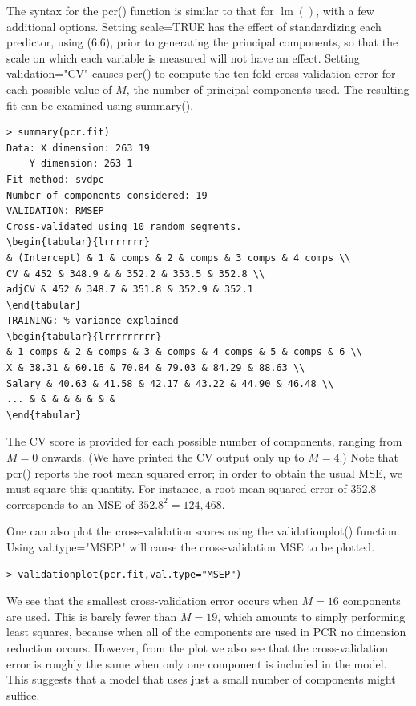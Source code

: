 \documentclass[10pt]{article}
\begin{document}
The syntax for the pcr() function is similar to that for $\operatorname{lm}()$, with a few additional options. Setting scale=TRUE has the effect of standardizing each predictor, using (6.6), prior to generating the principal components, so that the scale on which each variable is measured will not have an effect. Setting validation="CV" causes pcr() to compute the ten-fold cross-validation error for each possible value of $M$, the number of principal components used. The resulting fit can be examined using summary().

\begin{verbatim}
> summary(pcr.fit)
Data: X dimension: 263 19
    Y dimension: 263 1
Fit method: svdpc
Number of components considered: 19
VALIDATION: RMSEP
Cross-validated using 10 random segments.
\begin{tabular}{lrrrrrrr} 
& (Intercept) & 1 & comps & 2 & comps & 3 comps & 4 comps \\
CV & 452 & 348.9 & & 352.2 & 353.5 & 352.8 \\
adjCV & 452 & 348.7 & 351.8 & 352.9 & 352.1
\end{tabular}
TRAINING: % variance explained
\begin{tabular}{lrrrrrrrrr} 
& 1 comps & 2 & comps & 3 & comps & 4 comps & 5 & comps & 6 \\
X & 38.31 & 60.16 & 70.84 & 79.03 & 84.29 & 88.63 \\
Salary & 40.63 & 41.58 & 42.17 & 43.22 & 44.90 & 46.48 \\
... & & & & & & & &
\end{tabular}
\end{verbatim}

The CV score is provided for each possible number of components, ranging from $M=0$ onwards. (We have printed the CV output only up to $M=4$.) Note that pcr() reports the root mean squared error; in order to obtain the usual MSE, we must square this quantity. For instance, a root mean squared error of 352.8 corresponds to an MSE of $352.8^{2}=124,468$.

One can also plot the cross-validation scores using the validationplot() function. Using val.type="MSEP" will cause the cross-validation MSE to be plotted.

\begin{verbatim}
> validationplot(pcr.fit,val.type="MSEP")
\end{verbatim}

We see that the smallest cross-validation error occurs when $M=16$ components are used. This is barely fewer than $M=19$, which amounts to simply performing least squares, because when all of the components are used in PCR no dimension reduction occurs. However, from the plot we also see that the cross-validation error is roughly the same when only one component is included in the model. This suggests that a model that uses just a small number of components might suffice.
\end{document}
